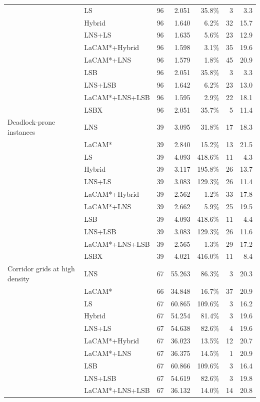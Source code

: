 \begin{table}[t]
\begin{tabular}{llrrrrr}
 & LS & 96 & 2.051 & 35.8\% & 3 & 3.3\\
 & Hybrid & 96 & 1.640 & 6.2\% & 32 & 15.7\\
 & LNS+LS & 96 & 1.635 & 5.6\% & 23 & 12.9\\
 & LaCAM*+Hybrid & 96 & 1.598 & 3.1\% & 35 & 19.6\\
 & LaCAM*+LNS & 96 & 1.579 & 1.8\% & 45 & 20.9\\
 & LSB & 96 & 2.051 & 35.8\% & 3 & 3.3\\
 & LNS+LSB & 96 & 1.642 & 6.2\% & 23 & 13.0\\
 & LaCAM*+LNS+LSB & 96 & 1.595 & 2.9\% & 22 & 18.1\\
 & LSBX & 96 & 2.051 & 35.7\% & 5 & 11.4\\
\midrule
Deadlock-prone instances & LNS & 39 & 3.095 & 31.8\% & 17 & 18.3\\
 & LaCAM* & 39 & 2.840 & 15.2\% & 13 & 21.5\\
 & LS & 39 & 4.093 & 418.6\% & 11 & 4.3\\
 & Hybrid & 39 & 3.117 & 195.8\% & 26 & 13.7\\
 & LNS+LS & 39 & 3.083 & 129.3\% & 26 & 11.4\\
 & LaCAM*+Hybrid & 39 & 2.562 & 1.2\% & 33 & 17.8\\
 & LaCAM*+LNS & 39 & 2.662 & 5.9\% & 25 & 19.5\\
 & LSB & 39 & 4.093 & 418.6\% & 11 & 4.4\\
 & LNS+LSB & 39 & 3.083 & 129.3\% & 26 & 11.6\\
 & LaCAM*+LNS+LSB & 39 & 2.565 & 1.3\% & 29 & 17.2\\
 & LSBX & 39 & 4.021 & 416.0\% & 11 & 8.4\\
\midrule
Corridor grids at high density & LNS & 67 & 55.263 & 86.3\% & 3 & 20.3\\
 & LaCAM* & 66 & 34.848 & 16.7\% & 37 & 20.9\\
 & LS & 67 & 60.865 & 109.6\% & 3 & 16.2\\
 & Hybrid & 67 & 54.254 & 81.4\% & 3 & 19.6\\
 & LNS+LS & 67 & 54.638 & 82.6\% & 4 & 19.6\\
 & LaCAM*+Hybrid & 67 & 36.023 & 13.5\% & 12 & 20.7\\
 & LaCAM*+LNS & 67 & 36.375 & 14.5\% & 1 & 20.9\\
 & LSB & 67 & 60.866 & 109.6\% & 3 & 16.4\\
 & LNS+LSB & 67 & 54.619 & 82.6\% & 3 & 19.8\\
 & LaCAM*+LNS+LSB & 67 & 36.132 & 14.0\% & 14 & 20.8\\

\end{tabular}
\end{table}
